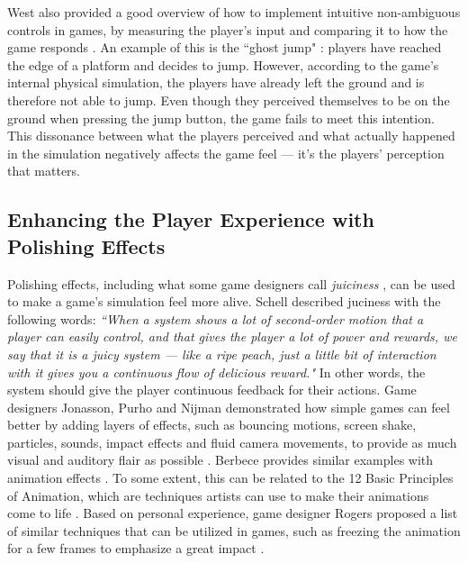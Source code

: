 West also provided a good overview of how to implement intuitive non-ambiguous controls in games, by measuring the player's input and comparing it to how the game responds \cite{intuitive_buttons}. An example of this is the ``ghost jump" \cite{ghostJump, canabalt}: players have reached the edge of a platform and decides to jump. However, according to the game's internal physical simulation, the players have already left the ground and is therefore not able to jump. Even though they perceived themselves to be on the ground when pressing the jump button, the game fails to meet this intention. This dissonance between what the players perceived and what actually happened in the simulation negatively affects the game feel --- it's the players' perception that matters.


\subsection{Enhancing the Player Experience with Polishing Effects}
Polishing effects, including what some game designers call \textit{juiciness} \cite{juice3}, can be used to make a game's simulation feel more alive. Schell described juciness with the following words: \textit{``When a system shows a lot of second-order motion that a player can easily control, and that gives the player a lot of power and rewards, we say that it is a juicy system --- like a ripe peach, just a little bit of interaction with it gives you a continuous flow of delicious reward."} \cite{schell_art_2008} In other words, the system should give the player continuous feedback for their actions. Game designers Jonasson, Purho and Nijman demonstrated how simple games can feel better by adding layers of effects, such as bouncing motions, screen shake, particles, sounds, impact effects and fluid camera movements, to provide as much visual and auditory flair as possible \cite{juice1, juice2}. Berbece provides similar examples with animation effects \cite{animationSucks}. To some extent, this can be related to the 12 Basic Principles of Animation, which are techniques artists can use to make their animations come to life \cite{animation}. Based on personal experience, game designer Rogers proposed a list of similar techniques that can be utilized in games, such as freezing the animation for a few frames to emphasize a great impact \cite{sticky}.

